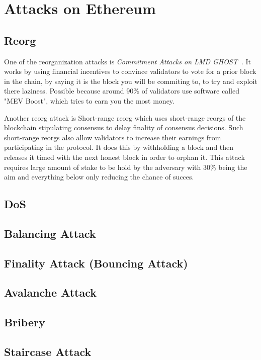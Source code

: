 
\section{Attacks on Ethereum}\label{sec:attacks-on-ethereum}
\subsection{Reorg}\label{subsec:reorg}
One of the reorganization attacks is \textit{Commitment Attacks on LMD GHOST}~\cite{sarenche2024breakingbalancepowercommitment}.
It works by using financial incentives to convince validators to vote for a prior block in the chain, by saying it is the block you will be commiting to, to try and exploit there laziness.
Possible because around 90\% of validators use software called "MEV Boost", which tries to earn you the most money.

Another reorg attack is Short-range reorg which uses short-range reorgs of the blockchain stipulating consensus to delay finality of consensus decisions.
Such short-range reorgs also allow validators to increase their earnings from participating in the protocol.
It does this by withholding a block and then releases it timed with the next honest block in order to orphan it.
This attack requires large amount of stake to be hold by the adversary with 30\% being the aim and everything below only reducing the chance of succes.





\subsection{DoS}\label{subsec:dos}

\subsection{Balancing Attack}\label{subsec:balancing-attack}

\subsection{Finality Attack (Bouncing Attack)}\label{subsec:finality-attack-(bouncing-attack)}

\subsection{Avalanche Attack}\label{subsec:avalanche-attack}

\subsection{Bribery}\label{subsec:bribery}

\subsection{Staircase Attack}\label{subsec:staircase-attack}